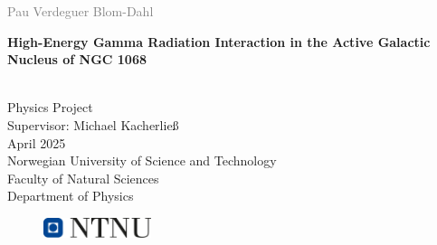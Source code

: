 \documentclass[a4paper, 12pt,oneside]{book} %
\begin{document}


\begin{titlepage}
\vspace*{1.5cm}

\noindent  \textcolor{gray}{\large Pau Verdeguer Blom-Dahl} \\
\vspace{1cm}

\noindent \textbf{\Large High-Energy Gamma Radiation Interaction in the Active Galactic Nucleus of NGC 1068} \\
\vspace{0.5cm}

 \\



\vspace{7cm}
\noindent Physics Project\\
Supervisor: Michael Kacherließ \\
April 2025 \\

\vspace{0.2cm}
\noindent Norwegian University of Science and Technology \\
Faculty of Natural Sciences \\
Department of Physics \\

\begin{figure}[h]
    \includegraphics[width=0.28\textwidth]{Figures/ntnu_basic.png}
\end{figure}
\end{titlepage}


\end{document}
